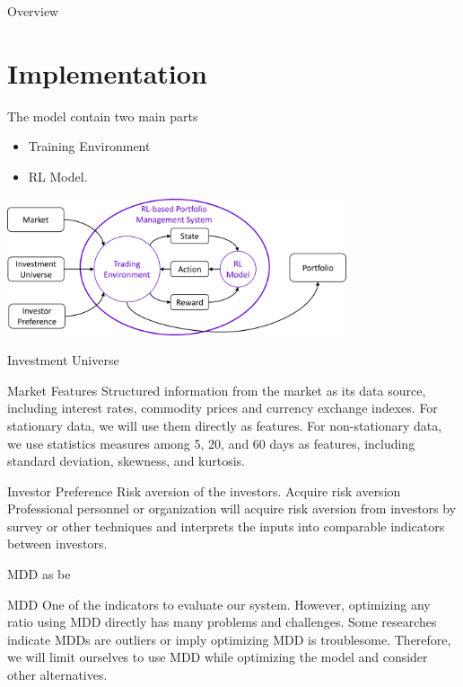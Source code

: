 \begin{frame}{Overview}
\section{Implementation}
The model contain two main parts
\begin{itemize}
    \item Training Environment
    \item RL Model. 
\end{itemize}
\begin{center}
  \includegraphics[width=10cm]{images/context_diagram.png}  
\end{center}
\end{frame}



\begin{frame}{Investment Universe}
\end{frame}


\begin{frame}{Market Features}
Structured information from the market as its data source, including interest rates, commodity prices and currency exchange indexes.
For stationary data, we will use them directly as features. For non-stationary data, we use statistics measures among 5, 20, and 60 days as features, including standard deviation, skewness, and kurtosis.
\end{frame}



\begin{frame}{Investor Preference}
Risk aversion of the investors. 
Acquire risk aversion
Professional personnel or organization will acquire risk aversion from investors by survey or other techniques and interprets the inputs into comparable indicators between investors.

MDD as be 

\begin{block}{MDD}
One of the indicators to evaluate our system. However, optimizing any ratio using MDD directly has many problems and challenges. Some researches indicate MDDs are outliers or imply optimizing MDD is troublesome. Therefore, we will limit ourselves to use MDD while optimizing the model and consider other alternatives. 
\end{block}
\end{frame}



